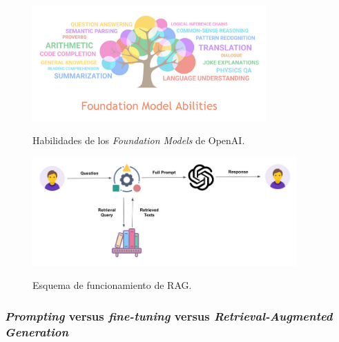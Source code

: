 \begin{figure}[H]
  \caption{Habilidades de los \emph{Foundation Models} de OpenAI.}
  \centering
  \includegraphics[width=0.8\textwidth]{./figuras/fundation_models_habilities.png}
  \label{fig:fundation_models_habilities}
\end{figure}

\begin{figure}[H]
    \caption[Esquema de funcionamiento de RAG]{Esquema de funcionamiento de RAG.}
    \centering
    \includegraphics[width=0.9\textwidth]{./figuras/rag.png}
    \label{fig:rag}
\end{figure}


\subsubsection{\emph{Prompting} versus \emph{fine-tuning} versus \emph{Retrieval-Augmented Generation}}

